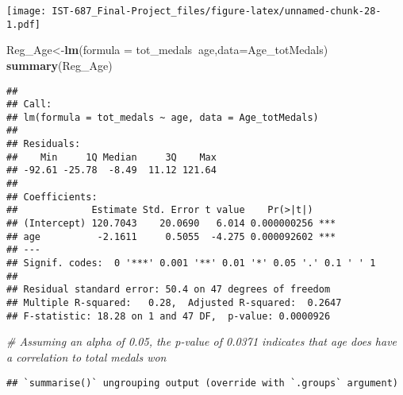 \documentclass[]{article}
\newenvironment{Shaded}{\begin{snugshade}}{\end{snugshade}}
\newcommand{\CommentTok}[1]{\textcolor[rgb]{0.56,0.35,0.01}{\textit{#1}}}
\newcommand{\DataTypeTok}[1]{\textcolor[rgb]{0.13,0.29,0.53}{#1}}
\newcommand{\KeywordTok}[1]{\textcolor[rgb]{0.13,0.29,0.53}{\textbf{#1}}}
\newcommand{\NormalTok}[1]{#1}
\newcommand{\OperatorTok}[1]{\textcolor[rgb]{0.81,0.36,0.00}{\textbf{#1}}}
\newcommand{\StringTok}[1]{\textcolor[rgb]{0.31,0.60,0.02}{#1}}
\begin{document}
\texttt{[image: IST-687\_Final-Project\_files/figure-latex/unnamed-chunk-28-1.pdf]}

\begin{Shaded}
\begin{Highlighting}[]
\NormalTok{Reg_Age<-}\KeywordTok{lm}\NormalTok{(}\DataTypeTok{formula =}\NormalTok{ tot_medals}\OperatorTok{~}\NormalTok{age,}\DataTypeTok{data=}\NormalTok{Age_totMedals)}
\KeywordTok{summary}\NormalTok{(Reg_Age)}
\end{Highlighting}
\end{Shaded}

\begin{verbatim}
## 
## Call:
## lm(formula = tot_medals ~ age, data = Age_totMedals)
## 
## Residuals:
##    Min     1Q Median     3Q    Max 
## -92.61 -25.78  -8.49  11.12 121.64 
## 
## Coefficients:
##             Estimate Std. Error t value    Pr(>|t|)    
## (Intercept) 120.7043    20.0690   6.014 0.000000256 ***
## age          -2.1611     0.5055  -4.275 0.000092602 ***
## ---
## Signif. codes:  0 '***' 0.001 '**' 0.01 '*' 0.05 '.' 0.1 ' ' 1
## 
## Residual standard error: 50.4 on 47 degrees of freedom
## Multiple R-squared:   0.28,  Adjusted R-squared:  0.2647 
## F-statistic: 18.28 on 1 and 47 DF,  p-value: 0.0000926
\end{verbatim}

\begin{Shaded}
\begin{Highlighting}[]
\CommentTok{# Assuming an alpha of 0.05, the p-value of 0.0371 indicates that age does have a correlation to total medals won}
\end{Highlighting}
\end{Shaded}

\begin{Shaded}
\end{Shaded}

\begin{verbatim}
## `summarise()` ungrouping output (override with `.groups` argument)
\end{verbatim}
\end{document}
